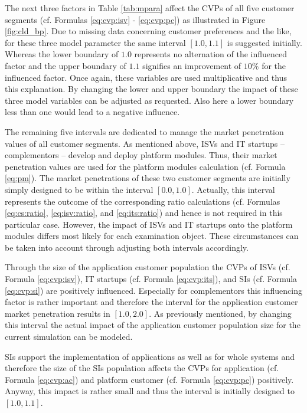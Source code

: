 The next three factors in Table \ref{tab:mpara} affect the \acp{CVP} of all five customer segments (cf. Formulas \ref{eq:cvp:isv} - \ref{eq:cvp:pc}) as illustrated in Figure \ref{fig:cld_bp}. Due to missing data concerning customer preferences and the like, for these three model parameter the same interval $[1.0,1.1]$ is suggested initially. Whereas the lower boundary of $1.0$ represents no alternation of the influenced factor and the upper boundary of $1.1$ signifies an improvement of $10\%$ for the influenced factor. Once again, these variables are used multiplicative and thus this explanation. By changing the lower and upper boundary the impact of these three model variables can be adjusted as requested. Also here a lower boundary less than one would lead to a negative influence.

The remaining five intervals are dedicated to manage the market penetration values of all customer segments. As mentioned above, \acp{ISV} and \ac{IT} startups -- complementors -- develop and deploy platform modules. Thus, their market penetration values are used for the platform modules calculation (cf. Formula \ref{eq:pm}). The market penetrations of these two customer segments are initially simply designed to be within the interval $[0.0,1.0]$. Actually, this interval represents the outcome of the corresponding ratio calculations (cf. Formulas \ref{eq:cs:ratio}, \ref{eq:isv:ratio}, and \ref{eq:its:ratio}) and hence is not required in this particular case. However, the impact of \acp{ISV} and \ac{IT} startups onto the platform modules differs most likely for each examination object. These circumstances can be taken into account through adjusting both intervals accordingly.

Through the size of the application customer population the \acp{CVP} of \acp{ISV} (cf. Formula \ref{eq:cvp:isv}), \ac{IT} startups (cf. Formula \ref{eq:cvp:its}), and \acp{SI} (cf. Formula \ref{eq:cvp:si}) are positively influenced. Especially for complementors this influencing factor is rather important and therefore the interval for the application customer market penetration results in $[1.0,2.0]$. As previously mentioned, by changing this interval the actual impact of the application customer population size for the current simulation can be modeled.

\acp{SI} support the implementation of applications as well as for whole systems and therefore the size of the \acp{SI} population affects the \acp{CVP} for application (cf. Formula \ref{eq:cvp:ac}) and platform customer (cf. Formula \ref{eq:cvp:pc}) positively. Anyway, this impact is rather small and thus the interval is initially designed to $[1.0,1.1]$.

